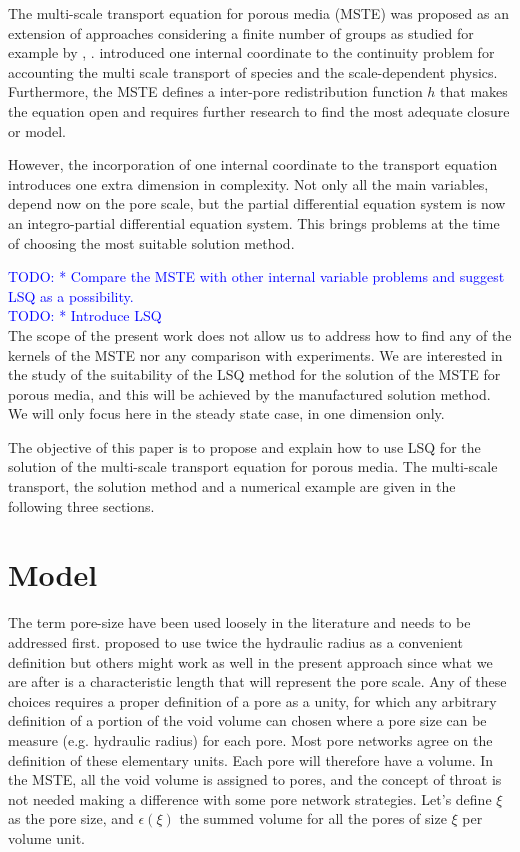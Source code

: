 \documentclass{CFD2011}
\newcommand{\TODO}[1]{\textcolor{blue}{TODO: #1} \\}
\begin{document}
The multi-scale transport equation for porous media (MSTE) was proposed as an extension of approaches considering a finite number of groups as studied for example by \cite{Chen1989}, \cite{bouffard2001}. \cite{DupuySchwarz} introduced one internal coordinate to the continuity problem for accounting the multi scale transport of species and the scale-dependent physics. Furthermore, the MSTE defines a inter-pore redistribution function $h$ that makes the equation open and requires further research to find the most adequate closure or model.

However, the incorporation of one internal coordinate to the transport equation introduces one extra dimension in complexity. Not only all the main variables, depend now on the pore scale, but the partial differential equation system is now an integro-partial differential equation system. This brings problems at the time of choosing the most suitable solution method. 

\TODO{     * Compare the MSTE with other internal variable problems and suggest LSQ as a possibility.}

\TODO{     * Introduce LSQ}




The scope of the present work does not allow us to address how to find any of the kernels of the MSTE nor any comparison with experiments. We are interested in the study of the suitability of the LSQ method for the solution of the MSTE for porous media, and this will be achieved by the manufactured solution method. We will only focus here in the steady state case, in one dimension only.

The objective of this paper is to propose and explain how to use LSQ for the solution of the multi-scale transport equation for porous media. The multi-scale transport, the solution method and a numerical example are given in the following three sections.

\section{Model}

The term pore-size have been used loosely in the literature and needs to be addressed first. \cite{Dullien} proposed to use twice the hydraulic radius as a convenient definition but others might work as well in the present approach since what we are after is a characteristic length that will represent the pore scale. Any of these choices requires a proper definition of a pore as a unity, for which any arbitrary definition of a portion of the void volume can chosen where a pore size can be measure (e.g. hydraulic radius) for each pore. Most pore networks agree on the definition of these elementary units. Each pore will therefore have a volume. In the MSTE, all the void volume is assigned to pores, and the concept of throat is not needed making a difference with some pore network strategies. Let's define $\xi$ as the pore size, and $\epsilon(\xi)$ the summed volume for all the pores of size $\xi$ per volume unit.
\end{document}
